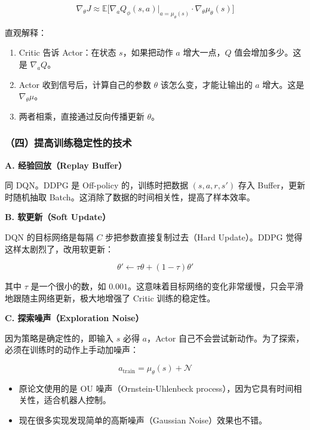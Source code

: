 \[
\nabla_\theta J
\approx
\mathbb{E}
\bigl[
\nabla_a Q_\phi(s,a)
\big|_{a=\mu_\theta(s)}
\cdot
\nabla_\theta \mu_\theta(s)
\bigr]
\]

直观解释：

\begin{enumerate}
\def\labelenumi{\arabic{enumi}.}
\tightlist
\item
  Critic 告诉 Actor：在状态 \(s\)，如果把动作 \(a\) 增大一点，\(Q\) 值会增加多少。这是 \(\nabla_a Q\)。
\item
  Actor 收到信号后，计算自己的参数 \(\theta\) 该怎么变，才能让输出的 \(a\) 增大。这是 \(\nabla_\theta\mu\)。
\item
  两者相乘，直接通过反向传播更新 \(\theta\)。
\end{enumerate}

\hypertarget{ux56dbux63d0ux9ad8ux8badux7ec3ux7a33ux5b9aux6027ux7684ux6280ux672f}{%
\subsubsection{（四）提高训练稳定性的技术}\label{ux56dbux63d0ux9ad8ux8badux7ec3ux7a33ux5b9aux6027ux7684ux6280ux672f}}

\textbf{A. 经验回放（Replay Buffer）}

同 DQN。DDPG 是 Off-policy 的，训练时把数据 \((s,a,r,s')\) 存入 Buffer，更新时随机抽取 Batch。这消除了数据的时间相关性，提高了样本效率。

\textbf{B. 软更新（Soft Update）}

DQN 的目标网络是每隔 \(C\) 步把参数直接复制过去（Hard Update）。DDPG 觉得这样太剧烈了，改用软更新：

\[
\theta'
\leftarrow
\tau\theta+(1-\tau)\theta'
\]

其中 \(\tau\) 是一个很小的数，如 \(0.001\)。这意味着目标网络的变化非常缓慢，只会平滑地跟随主网络更新，极大地增强了 Critic 训练的稳定性。

\textbf{C. 探索噪声（Exploration Noise）}

因为策略是确定性的，即输入 \(s\) 必得 \(a\)，Actor 自己不会尝试新动作。为了探索，必须在训练时的动作上手动加噪声：

\[
a_{\mathrm{train}}
=
\mu_\theta(s)+\mathcal{N}
\]

\begin{itemize}
\tightlist
\item
  原论文使用的是 OU 噪声（Ornstein-Uhlenbeck process），因为它具有时间相关性，适合机器人控制。
\item
  现在很多实现发现简单的高斯噪声（Gaussian Noise）效果也不错。
\end{itemize}

